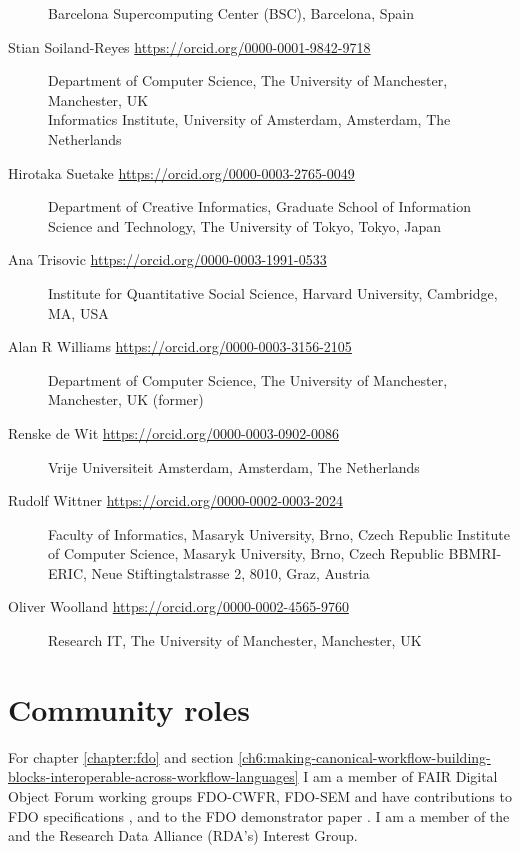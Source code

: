 \begin{flushleft}
\begin{description}
Barcelona Supercomputing Center (BSC), Barcelona, Spain
\item[Stian Soiland-Reyes \url{https://orcid.org/0000-0001-9842-9718}]
Department of Computer Science, The University of Manchester,
Manchester, UK\\
Informatics Institute, University of Amsterdam, Amsterdam, The
Netherlands
\item[Hirotaka Suetake \url{https://orcid.org/0000-0003-2765-0049}]
Department of Creative Informatics, Graduate School of Information Science and Technology, The University of Tokyo, Tokyo, Japan
\item[Ana Trisovic \url{https://orcid.org/0000-0003-1991-0533}]
Institute for Quantitative Social Science, Harvard University,
Cambridge, MA, USA
\item[Alan R Williams \url{https://orcid.org/0000-0003-3156-2105}] 
Department of Computer Science, The University of Manchester,
Manchester, UK (former)
\item[Renske de Wit \url{https://orcid.org/0000-0003-0902-0086}]
Vrije Universiteit Amsterdam, Amsterdam, The Netherlands

\item[Rudolf Wittner \url{https://orcid.org/0000-0002-0003-2024}]
Faculty of Informatics, Masaryk University, Brno, Czech Republic
Institute of Computer Science, Masaryk University, Brno, Czech Republic
BBMRI-ERIC, Neue Stiftingtalstrasse 2, 8010, Graz, Austria
\item[Oliver Woolland \url{https://orcid.org/0000-0002-4565-9760}]
Research IT, The University of Manchester, Manchester, UK


\end{description}\end{flushleft}


\section{Community roles}

For chapter \ref{chapter:fdo} and section \ref{ch6:making-canonical-workflow-building-blocks-interoperable-across-workflow-languages} I am a member of FAIR Digital Object Forum \cite{FAIRDigitalObjects} working groups FDO-CWFR, FDO-SEM and have contributions to FDO specifications \cite{fdo-RequirementSpec,fdo-Overview}, and to the FDO demonstrator paper \cite{wittenburgFAIRDigitalObject2022b}. I am a member of the  and the Research Data Alliance (RDA's)  Interest Group.

